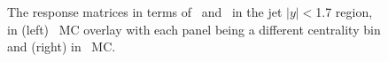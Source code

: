\begin{figure}
\begin{subfigure}{0.30\textwidth}
\caption{}
\label{fig:pp_ChPS_closure}
\end{subfigure}
\caption{The response matrices in terms of \ptjetreco\ and \ptjettruth\ in the jet $|y| < $1.7 region, in (left) \pbpb\ MC overlay with each panel being a different centrality bin and (right) in \pp\ MC.}
\label{fig:ChPS_closure}
\end{figure}




